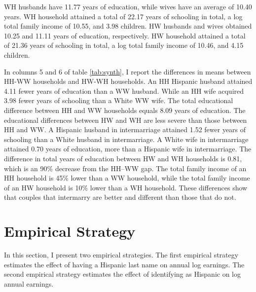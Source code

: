 \documentclass[12pt,english]{article}
\begin{document}
WH husbands have 11.77 years of education, while wives have an average of 10.40 years. WH household attained a total of 22.17 years of schooling in total, a log total family income of 10.55, and 3.98 children. HW husbands and wives obtained 10.25 and 11.11 years of education, respectively. HW household attained a total of 21.36 years of schooling in total, a log total family income of 10.46, and 4.15 children.


In columns 5 and 6 of table \ref{tab:synth}, I report the differences in means between HH-WW households and HW-WH households. An HH Hispanic husband attained 4.11 fewer years of education than a WW husband. While an HH wife acquired 3.98 fewer years of schooling than a White WW wife. The total educational difference between HH and WW households equals 8.09 years of education. The educational differences between HW and WH are less severe than those between HH and WW. A Hispanic husband in intermarriage attained 1.52 fewer years of schooling than a White husband in intermarriage. A White wife in intermarriage attained 0.70 years of education, more than a Hispanic wife in intermarriage. The difference in total years of education between HW and WH households is 0.81, which is an 90\% decrease from the HH--WW gap. The total family income of an HH household is 45\% lower than a WW household, while the total family income of an HW household is 10\% lower than a WH household. These differences show that couples that intermarry are better and different than those that do not.



\section{Empirical Strategy}\label{sec:emp_model}

In this section, I present two empirical strategies. The first empirical strategy estimates the effect of having a Hispanic last name on annual log earnings. The second empirical strategy estimates the effect of identifying as Hispanic on log annual earnings.
\end{document}
